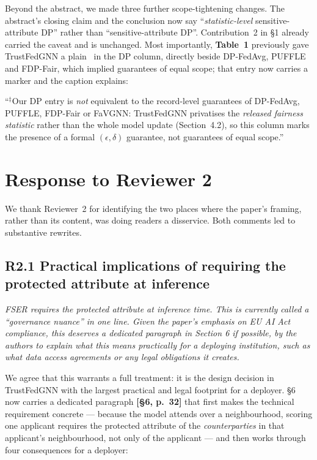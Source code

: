 \documentclass[11pt,a4paper]{article}
\newenvironment{comment}
  {\begin{mdframed}[backgroundcolor=quotegray,linewidth=0pt,skipabove=8pt,
    skipbelow=6pt,innertopmargin=6pt,innerbottommargin=6pt]\itshape}
  {\end{mdframed}}
\newenvironment{newtextbox}
  {\begin{mdframed}[linecolor=newtext!45,linewidth=0.8pt,skipabove=6pt,
    skipbelow=8pt,innertopmargin=6pt,innerbottommargin=6pt]\small}
  {\end{mdframed}}
\newcommand{\where}[1]{\textcolor{revblue}{\textbf{[#1]}}}
\begin{document}
Beyond the abstract, we made three further scope-tightening changes. The
abstract's closing claim and the conclusion now say ``\emph{statistic-level}
sensitive-attribute DP'' rather than ``sensitive-attribute DP''. Contribution~2
in \S1 already carried the caveat and is unchanged. Most importantly,
\textbf{Table~1} previously gave TrustFedGNN a plain \checkmark\ in the DP
column, directly beside DP-FedAvg, PUFFLE and FDP-Fair, which implied
guarantees of equal scope; that entry now carries a marker and the caption
explains:

\begin{newtextbox}
``$^{\ddagger}$Our DP entry is \emph{not} equivalent to the record-level
guarantees of DP-FedAvg, PUFFLE, FDP-Fair or FaVGNN: TrustFedGNN privatises the
\emph{released fairness statistic} rather than the whole model update
(Section~4.2), so this column marks the presence of a formal
$(\epsilon,\delta)$ guarantee, not guarantees of equal scope.''
\end{newtextbox}

\section{Response to Reviewer 2}

We thank Reviewer~2 for identifying the two places where the paper's framing,
rather than its content, was doing readers a disservice. Both comments led to
substantive rewrites.

\subsection*{R2.1 Practical implications of requiring the protected attribute at inference}
\label{sec:r2-1}

\begin{comment}
FSER requires the protected attribute at inference time. This is currently
called a ``governance nuance'' in one line. Given the paper's emphasis on EU AI
Act compliance, this deserves a dedicated paragraph in Section 6 if possible, by
the authors to explain what this means practically for a deploying institution,
such as what data access agreements or any legal obligations it creates.
\end{comment}

We agree that this warrants a full treatment: it is the design decision in
TrustFedGNN with the largest practical and legal footprint for a deployer.
\S6 now
carries a dedicated paragraph \where{\S6, p.~32} that first makes the technical
requirement concrete --- because the model attends over a neighbourhood, scoring
one applicant requires the protected attribute of the \emph{counterparties} in
that applicant's neighbourhood, not only of the applicant --- and then works
through four consequences for a deployer:
\end{document}
